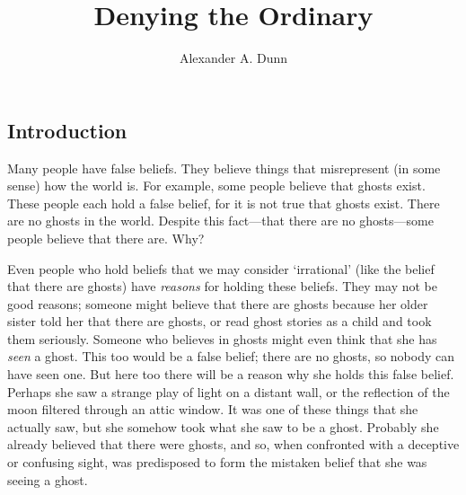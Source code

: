 \documentclass[11pt]{standalone}
\title{Denying the Ordinary}
\author{Alexander A. Dunn}
\newenvironment{inq}{\vspace{0pt}%
	\begin{list}{}%
	{\setlength\labelwidth{0pt}%
	\setlength\leftmargin{2.5\oddsidemargin}%
	\setlength\rightmargin{\leftmargin}}
	\begin{spacing}{1}
	\item[]%
	}{
	\end{spacing}
	\end{list}
	\vspace{10pt}
	}
\begin{document}
\ifstandalone
\maketitle
\tableofcontents
\begin{spacing}{1.5}
\fi





\section{Introduction}
\label{intro-deny}
\noindent Many people have false beliefs.  They believe things that
misrepresent (in some sense) how the world is.  For example, some
people believe that ghosts exist.  These people each hold a false
belief, for it is not true that ghosts exist.  There are no ghosts in
the world.  Despite this fact---that there are no ghosts---some people
believe that there are.  Why?

Even people who hold beliefs that we may consider `irrational' (like
the belief that there are ghosts) have {\em reasons} for holding these
beliefs.  They may not be good reasons; someone might believe that
there are ghosts because her older sister told her that there are
ghosts, or read ghost stories as a child and took them seriously.
Someone who believes in ghosts might even think that she has {\em
  seen} a ghost.  This too would be a false belief; there are no
ghosts, so nobody can have seen one.  But here too there will be a
reason why she holds this false belief.  Perhaps she saw a strange
play of light on a distant wall, or the reflection of the moon
filtered through an attic window.  It was one of these things that she
actually saw, but she somehow took what she saw to be a ghost.
Probably she already believed that there were ghosts, and so, when
confronted with a deceptive or confusing sight, was predisposed to
form the mistaken belief that she was seeing a ghost.


\end{spacing}
\end{document}
